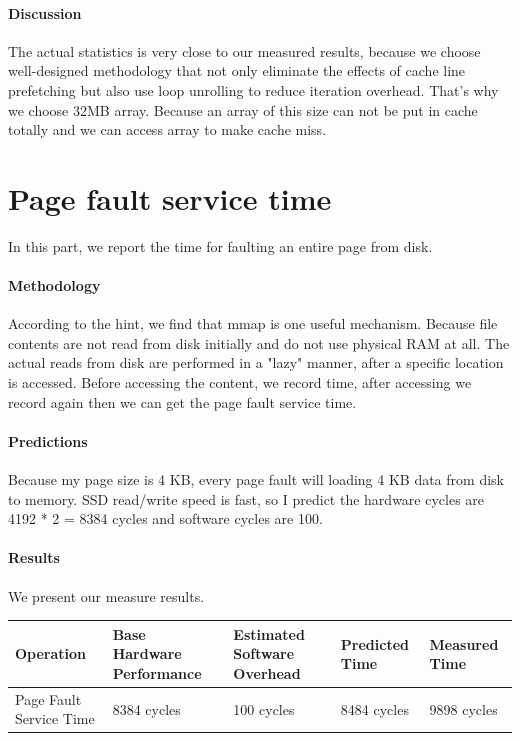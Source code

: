 \paragraph{Discussion}
The actual statistics is very close to our measured results, because we choose well-designed methodology that not only eliminate the effects of cache line prefetching but also use loop unrolling to reduce iteration overhead. That's why we choose 32MB array. Because an array of this size can not be put in cache totally and we can access array to make cache miss.

\section{Page fault service time}
In this part, we report the time for faulting an entire page from disk.

\paragraph{Methodology}
According to the hint, we find that mmap is one useful mechanism. Because file contents are not read from disk initially and do not use physical RAM at all. The actual reads from disk are performed in a "lazy" manner, after a specific location is accessed. Before accessing the content, we record time, after accessing we record again then we can get the page fault service time.

\paragraph{Predictions}
Because my page size is 4 KB, every page fault will loading 4 KB data from disk to memory. SSD read/write speed is fast, so I predict the hardware cycles are 4192 * 2 = 8384 cycles and software cycles are 100.

\paragraph{Results}
We present our measure results.

\begin{center}
\begin{tabular}{| p{3cm} | p{3cm} | p{3cm} | p{3cm} | p{3cm} |}
Operation  & Base Hardware Performance  & Estimated Software Overhead  & Predicted Time  & Measured Time   \\
\hline
Page Fault Service Time & 8384 cycles& 100 cycles& 8484 cycles& 9898 cycles\\

\end{tabular}
\end{center}

